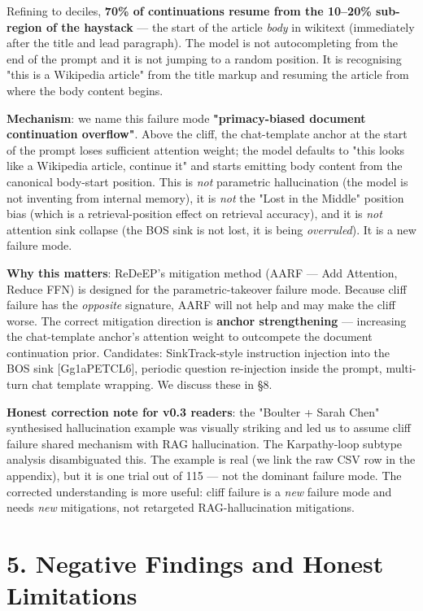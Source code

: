 \documentclass[11pt]{article}
\begin{document}
Refining to deciles, \textbf{70\% of continuations resume from the 10–20\% sub-region of the haystack} — the start of the article \textit{body} in wikitext (immediately after the title and lead paragraph). The model is not autocompleting from the end of the prompt and it is not jumping to a random position. It is recognising "this is a Wikipedia article" from the title markup and resuming the article from where the body content begins.


\textbf{Mechanism}: we name this failure mode \textbf{"primacy-biased document continuation overflow"}. Above the cliff, the chat-template anchor at the start of the prompt loses sufficient attention weight; the model defaults to "this looks like a Wikipedia article, continue it" and starts emitting body content from the canonical body-start position. This is \textit{not} parametric hallucination (the model is not inventing from internal memory), it is \textit{not} the "Lost in the Middle" position bias (which is a retrieval-position effect on retrieval accuracy), and it is \textit{not} attention sink collapse (the BOS sink is not lost, it is being \textit{overruled}). It is a new failure mode.


\textbf{Why this matters}: ReDeEP's mitigation method (AARF — Add Attention, Reduce FFN) is designed for the parametric-takeover failure mode. Because cliff failure has the \textit{opposite} signature, AARF will not help and may make the cliff worse. The correct mitigation direction is \textbf{anchor strengthening} — increasing the chat-template anchor's attention weight to outcompete the document continuation prior. Candidates: SinkTrack-style instruction injection into the BOS sink [Gg1aPETCL6], periodic question re-injection inside the prompt, multi-turn chat template wrapping. We discuss these in §8.


\textbf{Honest correction note for v0.3 readers}: the "Boulter + Sarah Chen" synthesised hallucination example was visually striking and led us to assume cliff failure shared mechanism with RAG hallucination. The Karpathy-loop subtype analysis disambiguated this. The example is real (we link the raw CSV row in the appendix), but it is one trial out of 115 — not the dominant failure mode. The corrected understanding is more useful: cliff failure is a \textit{new} failure mode and needs \textit{new} mitigations, not retargeted RAG-hallucination mitigations.


\section*{5. Negative Findings and Honest Limitations}
\end{document}
